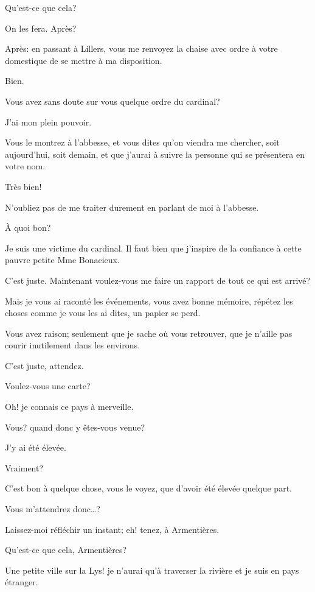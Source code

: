 \speak  Qu'est-ce que cela? 

\speak  On les fera. Après? 

\speak  Après: en passant à Lillers, vous me renvoyez la chaise avec ordre à votre domestique de se mettre à ma disposition. 

\speak  Bien. 

\speak  Vous avez sans doute sur vous quelque ordre du cardinal? 

\speak  J'ai mon plein pouvoir. 

\speak  Vous le montrez à l'abbesse, et vous dites qu'on viendra me chercher, soit aujourd'hui, soit demain, et que j'aurai à suivre la personne qui se présentera en votre nom. 

\speak  Très bien! 

\speak  N'oubliez pas de me traiter durement en parlant de moi à l'abbesse. 

\speak  À quoi bon? 

\speak  Je suis une victime du cardinal. Il faut bien que j'inspire de la confiance à cette pauvre petite Mme Bonacieux. 

\speak  C'est juste. Maintenant voulez-vous me faire un rapport de tout ce qui est arrivé? 

\speak  Mais je vous ai raconté les événements, vous avez bonne mémoire, répétez les choses comme je vous les ai dites, un papier se perd. 

\speak  Vous avez raison; seulement que je sache où vous retrouver, que je n'aille pas courir inutilement dans les environs. 

\speak  C'est juste, attendez. 

\speak  Voulez-vous une carte? 

\speak  Oh! je connais ce pays à merveille. 

\speak  Vous? quand donc y êtes-vous venue? 

\speak  J'y ai été élevée. 

\speak  Vraiment? 

\speak  C'est bon à quelque chose, vous le voyez, que d'avoir été élevée quelque part. 

\speak  Vous m'attendrez donc\dots? 

\speak  Laissez-moi réfléchir un instant; eh! tenez, à Armentières. 

\speak  Qu'est-ce que cela, Armentières? 

\speak  Une petite ville sur la Lys! je n'aurai qu'à traverser la rivière et je suis en pays étranger. 

